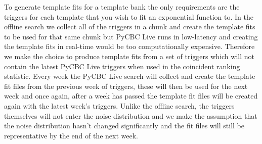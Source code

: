 To generate template fits for a template bank the only requirements are the triggers for each template that you wish to fit an exponential function to. In the offline search we collect all of the triggers in a chunk and create the template fits to be used for that same chunk but PyCBC Live runs in low-latency and creating the template fits in real-time would be too computationally expensive. Therefore we make the choice to produce template fits from a set of triggers which will not contain the latest PyCBC Live triggers when used in the coincident ranking statistic. Every week the PyCBC Live search will collect and create the template fit files from the previous week of triggers, these will then be used for the next week and once again, after a week has passed the template fit files will be created again with the latest week's triggers. Unlike the offline search, the triggers themselves will not enter the noise distribution and we make the assumption that the noise distribution hasn't changed significantly and the fit files will still be representative by the end of the next week.


  
  



